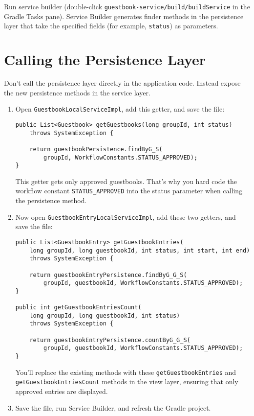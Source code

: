 Run service builder (double-click
\texttt{guestbook-service/build/buildService} in the Gradle Tasks pane).
Service Builder generates finder methods in the persistence layer that
take the specified fields (for example, \texttt{status}) as parameters.

\section{Calling the Persistence
Layer}\label{calling-the-persistence-layer}

Don't call the persistence layer directly in the application code.
Instead expose the new persistence methods in the service layer.

\begin{enumerate}
\def\labelenumi{\arabic{enumi}.}
\item
  Open \texttt{GuestbookLocalServiceImpl}, add this getter, and save the
  file:

\begin{verbatim}
public List<Guestbook> getGuestbooks(long groupId, int status)
    throws SystemException {

    return guestbookPersistence.findByG_S(
        groupId, WorkflowConstants.STATUS_APPROVED);
}
\end{verbatim}

  This getter gets only approved guestbooks. That's why you hard code
  the workflow constant \texttt{STATUS\_APPROVED} into the status
  parameter when calling the persistence method.
\item
  Now open \texttt{GuestbookEntryLocalServiceImpl}, add these two
  getters, and save the file:

\begin{verbatim}
public List<GuestbookEntry> getGuestbookEntries(
    long groupId, long guestbookId, int status, int start, int end)
    throws SystemException {

    return guestbookEntryPersistence.findByG_G_S(
        groupId, guestbookId, WorkflowConstants.STATUS_APPROVED);
}

public int getGuestbookEntriesCount(
    long groupId, long guestbookId, int status)
    throws SystemException {

    return guestbookEntryPersistence.countByG_G_S(
        groupId, guestbookId, WorkflowConstants.STATUS_APPROVED);
}
\end{verbatim}

  You'll replace the existing methods with these
  \texttt{getGuestbookEntries} and \texttt{getGuestbookEntriesCount}
  methods in the view layer, ensuring that only approved entries are
  displayed.
\item
  Save the file, run Service Builder, and refresh the Gradle project.
\end{enumerate}


